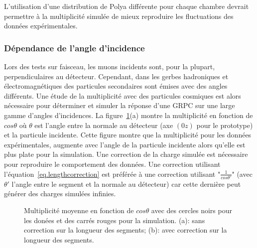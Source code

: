 L'utilisation d'une distribution de Polya différente pour chaque chambre devrait permettre à la multiplicité simulée de mieux reproduire les fluctuations des données expérimentales.

\subsubsection{Dépendance de l'angle d'incidence}
Lors des tests sur faisceau, les muons incidents sont, pour la plupart, perpendiculaires au détecteur. Cependant, dans les gerbes hadroniques et électromagnétiques des particules secondaires sont émises avec des angles différents. Une étude de la multiplicité avec des particules cosmiques est alors nécessaire pour déterminer et simuler la réponse d'une GRPC sur une large gamme d'angles d'incidences. La figure~\ref{fig.mul_vs_theta}(a) montre la multiplicité en fonction de $cos{\theta}$ où $\theta$ est l'angle entre la normale au détecteur (axe $(0z)$ pour le prototype) et la particule incidente. Cette figure montre que la multiplicité pour les données expérimentales, augmente avec l'angle de la particule incidente alors qu'elle est plus plate pour la simulation. Une correction de la charge simulée est nécessaire pour reproduire le comportement des données. Une correction utilisant l'équation~\ref{eq.lengthcorrection} est préférée à une correction utilisant "$\frac{1}{cos\theta'}$" (avec $\theta'$ l'angle entre le segment et la normale au détecteur) car cette dernière peut générer des charges simulées infinies. 
\begin{figure}[!ht]
  \caption{Multiplicité moyenne en fonction de $cos\theta$ avec des cercles noirs pour les donées et des carrés rouges pour la simulation. (a): sans correction sur la longueur des segments; (b): avec correction sur la longueur des segments. \label{fig.mul_vs_theta}}
\end{figure}

